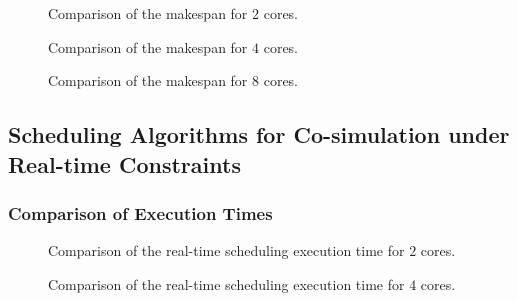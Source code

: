 \begin{figure}[phbt]
\centering

\caption{Comparison of the makespan for $2$ cores.}
\label{fig:sched_mkspan_2}
\end{figure}

\begin{figure}[phbt]
\centering

\caption{Comparison of the makespan for $4$ cores.}
\label{fig:sched_mkspan_4}
\end{figure}

\begin{figure}[phbt]
\centering

\caption{Comparison of the makespan for $8$ cores.}
\label{fig:sched_mkspan_8}
\end{figure} 

%

\subsection{Scheduling Algorithms for Co-simulation under Real-time Constraints}

\subsubsection{Comparison of Execution Times}

\begin{figure}[phbt]
\centering

\caption{Comparison of the real-time scheduling execution time for $2$ cores.}
\label{fig:RT_sched_exec_2}
\end{figure}

\begin{figure}[phbt]
\centering

\caption{Comparison of the real-time scheduling execution time for $4$ cores.}
\label{fig:RT_sched_exec_4}
\end{figure}

